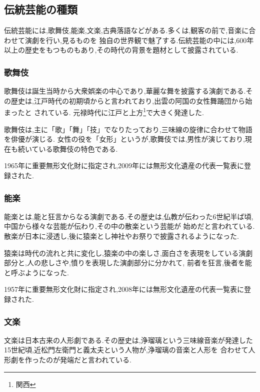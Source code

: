 \documentclass[12pt]{ltjsarticle}
\begin{document}
\subsection{伝統芸能の種類}
伝統芸能には,歌舞伎,能楽,文楽,古典落語などがある.多くは,観客の前で,音楽に合わせて演劇を行い,見るものを
独自の世界観で魅了する.伝統芸能の中には,600年以上の歴史をもつものもあり,その時代の背景を題材として披露されている.


\subsubsection{歌舞伎}
歌舞伎は誕生当時から大衆娯楽の中心であり,華麗な舞を披露する演劇である.その歴史は,江戸時代の初期頃からと言われており,出雲の阿国の女性舞踊団から始まったと
されている\cite{kabuki}.
元禄時代に江戸と上方\footnote{関西}で大きく発達した.

歌舞伎は,主に「歌」「舞」「技」でなりたっており,三味線の旋律に合わせて物語を俳優が演じる.
女性の役を「女形」というが,歌舞伎では,男性が演じており,現在も続いている歌舞伎の特色である.

1965年に重要無形文化財に指定され,2009年には無形文化遺産の代表一覧表に登録された.






\subsubsection{能楽}
能楽とは,能と狂言からなる演劇である.その歴史は,仏教が伝わった6世紀半ば頃,中国から様々な芸能が伝わり,その中の散楽という芸能が
始めだと言われている.散楽が日本に浸透し,後に猿楽とし神社やお祭りで披露されるようになった\cite{nou}.

猿楽は時代の流れと共に変化し,猿楽の中の楽しさ,面白さを表現をしている演劇部分と,人の悲しさや,憤りを表現した演劇部分に分かれて,
前者を狂言,後者を能と呼ぶようになった.

1957年に重要無形文化財に指定され,2008年には無形文化遺産の代表一覧表に登録された.





\subsubsection{文楽}
文楽は日本古来の人形劇である.その歴史は,浄瑠璃という三味線音楽が発達した15世紀頃,近松門左衛門と義太夫という人物が,浄瑠璃の音楽と人形を
合わせて人形劇を作ったのが発端だと言われている\cite{bun}.
\end{document}
